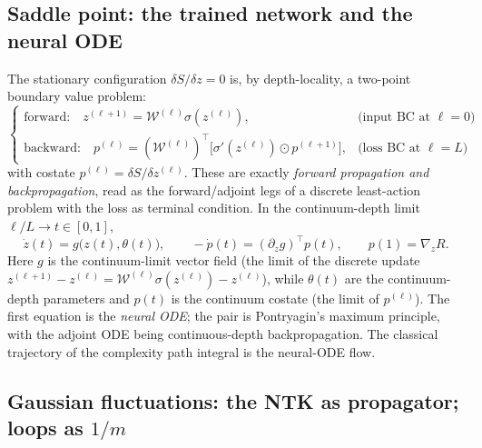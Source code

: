 \documentclass[11pt]{article}
\theoremstyle{definition}
\newcommand{\Wmet}{\mathcal{W}}
\begin{document}
\subsection{Saddle point: the trained network and the neural ODE}
\label{sec:saddle}

The stationary configuration $\delta S/\delta z=0$ is, by depth-locality, a two-point
boundary value problem:
\begin{equation}
\begin{cases}
\text{forward:}\quad z^{(\ell+1)}=\Wmet^{(\ell)}\sigma(z^{(\ell)}), & \text{(input BC at }\ell=0)\\[2pt]
\text{backward:}\quad p^{(\ell)}=(\Wmet^{(\ell)})^\top\big[\sigma'(z^{(\ell)})\odot p^{(\ell+1)}\big], & \text{(loss BC at }\ell=L)
\end{cases}
\label{eq:fwd-bwd}
\end{equation}
with costate $p^{(\ell)}=\delta S/\delta z^{(\ell)}$. These are exactly \emph{forward
propagation and backpropagation}, read as the forward/adjoint legs of a discrete
least-action problem with the loss as terminal condition. In the continuum-depth limit
$\ell/L\to t\in[0,1]$,
\begin{equation}
\boxed{\;
\dot z(t)=g\big(z(t),\theta(t)\big),
\qquad
-\dot p(t)=(\partial_z g)^\top p(t),
\qquad
p(1)=\nabla_z R.
\;}
\label{eq:node-pmp}
\end{equation}
Here $g$ is the continuum-limit vector field (the limit of the discrete update
$z^{(\ell+1)}-z^{(\ell)}=\Wmet^{(\ell)}\sigma(z^{(\ell)})-z^{(\ell)}$), while $\theta(t)$ are the
continuum-depth parameters and $p(t)$ is the continuum costate (the limit of $p^{(\ell)}$).
The first equation is the \emph{neural ODE}; the pair is Pontryagin's maximum principle,
with the adjoint ODE being continuous-depth backpropagation. The classical trajectory of
the complexity path integral is the neural-ODE flow.

\subsection{Gaussian fluctuations: the NTK as propagator; loops as \texorpdfstring{$1/m$}{1/m}}
\label{sec:loops}
\end{document}

